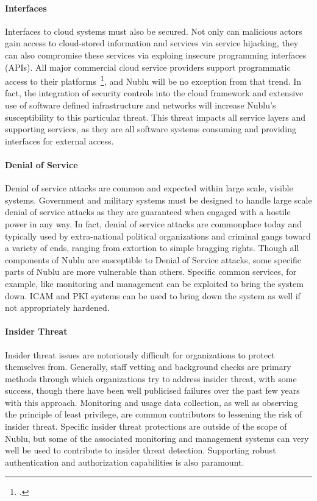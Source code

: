 \documentclass[10pt,letterpaper]{article}
\begin{document}
\paragraph{Interfaces} Interfaces to cloud systems must also be secured.  Not only can malicious actors gain access to cloud-stored information and services via service hijacking, they can also compromise these services via exploing insecure programming interfaces (APIs).  All major commercial cloud service providers support programmatic access to their platforms~\footcite{rackspace-api:13,amazon-api:13}, and Nublu will be no exception from that trend.  In fact, the integration of security controls into the cloud framework and extensive use of software defined infrastructure and networks will increase Nublu's susceptibility to this particular threat.  This threat impacts all service layers and supporting services, as they are all software systems consuming and providing interfaces for external access.

\paragraph{Denial of Service} Denial of service attacks are common and expected within large scale, visible systems.  Government and military systems must be designed to handle large scale denial of service attacks as they are guaranteed when engaged with a hostile power in any way.  In fact, denial of service attacks are commonplace today and typically used by extra-national political organizations and criminal gangs toward a variety of ends, ranging from extortion to simple bragging rights.  Though all components of Nublu are susceptible to Denial of Service attacks, some specific parts of Nublu are more vulnerable than others.  Specific common services, for example, like monitoring and management can be exploited to bring the system down.  ICAM and PKI systems can be used to bring down the system as well if not appropriately hardened.

\paragraph{Insider Threat} Insider threat issues are notoriously difficult for organizations to protect themselves from.  Generally, staff vetting and background checks are primary methods through which organizations try to address insider threat, with some success, though there have been well publicised failures over the past few years with this approach.  Monitoring and usage data collection, as well as observing the principle of least privilege, are common contributors to lessening the risk of insider threat.  Specific insider threat protections are outside of the scope of Nublu, but some of the associated monitoring and management systems can very well be used to contribute to insider threat detection.  Supporting robust authentication and authorization capabilities is also paramount.
\end{document}
